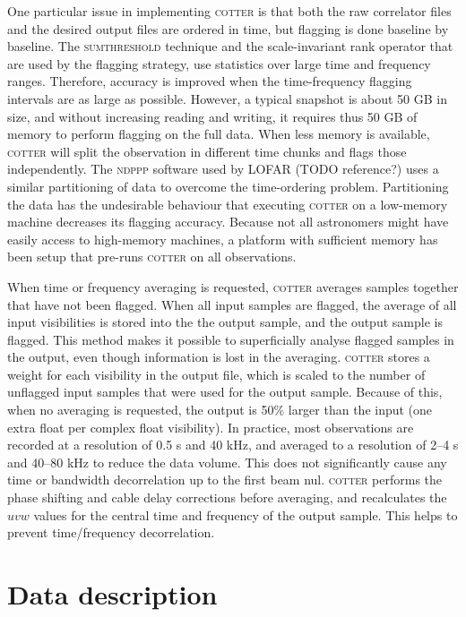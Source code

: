 \documentclass[useAMS,usenatbib]{mn2e}
\begin{document}
One particular issue in implementing \textsc{cotter} is that both the raw correlator files and the desired output files are ordered in time, but flagging is done baseline by baseline. The \textsc{sumthreshold} technique and the scale-invariant rank operator that are used by the flagging strategy, use statistics over large time and frequency ranges. Therefore, accuracy is improved when the time-frequency flagging intervals are as large as possible. However, a typical snapshot is about 50 GB in size, and without increasing reading and writing, it requires thus 50 GB of memory to perform flagging on the full data. When less memory is available, \textsc{cotter} will split the observation in different time chunks and flags those independently. The \textsc{ndppp} software used by LOFAR (TODO reference?) uses a similar partitioning of data to overcome the time-ordering problem. Partitioning the data has the undesirable behaviour that executing \textsc{cotter} on a low-memory machine decreases its flagging accuracy. Because not all astronomers might have easily access to high-memory machines, a platform with sufficient memory has been setup that pre-runs \textsc{cotter} on all observations.

When time or frequency averaging is requested, \textsc{cotter} averages samples together that have not been flagged. When all input samples are flagged, the average of all input visibilities is stored into the the output sample, and the output sample is flagged. This method makes it possible to superficially analyse flagged samples in the output, even though information is lost in the averaging. \textsc{cotter} stores a weight for each visibility in the output file, which is scaled to the number of unflagged input samples that were used for the output sample. Because of this, when no averaging is requested, the output is 50\% larger than the input (one extra float per complex float visibility). In practice, most observations are recorded at a resolution of 0.5 s and 40 kHz, and averaged to a resolution of 2--4 s and 40--80 kHz to reduce the data volume. This does not significantly cause any time or bandwidth decorrelation up to the first beam nul. \textsc{cotter} performs the phase shifting and cable delay corrections before averaging, and recalculates the $uvw$ values for the central time and frequency of the output sample. This helps to prevent time/frequency decorrelation.

\section{Data description}
\end{document}
